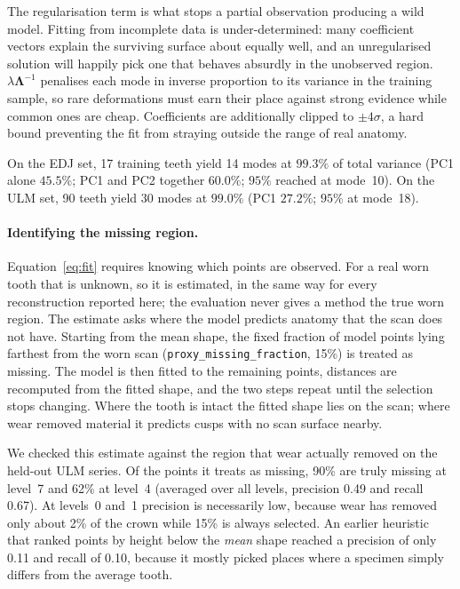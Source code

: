 \documentclass[10pt,a4paper,twocolumn]{article}
\newcommand{\code}[1]{\texttt{#1}}
\begin{document}
The regularisation term is what stops a partial observation producing a wild
model. Fitting from incomplete data is under-determined: many coefficient vectors
explain the surviving surface about equally well, and an unregularised solution
will happily pick one that behaves absurdly in the unobserved region.
$\lambda\bm{\Lambda}^{-1}$ penalises each mode in inverse proportion to its
variance in the training sample, so rare deformations must earn their place
against strong evidence while common ones are cheap. Coefficients are
additionally clipped to $\pm4\sigma$, a hard bound preventing the fit from
straying outside the range of real anatomy.

On the EDJ set, 17 training teeth yield 14 modes at $99.3\%$ of total variance
(PC1 alone $45.5\%$; PC1 and PC2 together $60.0\%$; $95\%$ reached at mode~10).
On the ULM set, 90 teeth yield 30 modes at $99.0\%$ (PC1 $27.2\%$; $95\%$ at
mode~18).

\paragraph{Identifying the missing region.}
Equation~\eqref{eq:fit} requires knowing which points are observed. For a real
worn tooth that is unknown, so it is estimated, in the same way for every
reconstruction reported here; the evaluation never gives a method the true worn
region. The estimate asks where the model predicts anatomy that the scan does not
have. Starting from the mean shape, the fixed fraction of model points lying
farthest from the worn scan (\code{proxy\_missing\_fraction}, 15\%) is treated
as missing. The model is then fitted to the remaining points, distances are
recomputed from the fitted shape, and the two steps repeat until the selection
stops changing. Where the tooth is intact the fitted shape lies on the scan;
where wear removed material it predicts cusps with no scan surface nearby.

We checked this estimate against the region that wear actually removed on the
held-out ULM series. Of the points it treats as missing, 90\% are truly missing
at level~7 and 62\% at level~4 (averaged over all levels, precision 0.49 and
recall 0.67). At levels~0 and~1 precision is necessarily low, because wear has
removed only about 2\% of the crown while 15\% is always selected. An earlier
heuristic that ranked points by height below the \emph{mean} shape reached a
precision of only 0.11 and recall of 0.10, because it mostly picked places where
a specimen simply differs from the average tooth.
\end{document}
